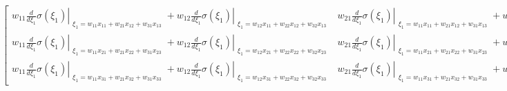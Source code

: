 $\displaystyle \left[\begin{matrix}w_{11} \left. \frac{d}{d \xi_{1}} \sigma{\left(\xi_{1} \right)} \right|_{\substack{ \xi_{1}=w_{11} x_{11} + w_{21} x_{12} + w_{31} x_{13} }} + w_{12} \left. \frac{d}{d \xi_{1}} \sigma{\left(\xi_{1} \right)} \right|_{\substack{ \xi_{1}=w_{12} x_{11} + w_{22} x_{12} + w_{32} x_{13} }} & w_{21} \left. \frac{d}{d \xi_{1}} \sigma{\left(\xi_{1} \right)} \right|_{\substack{ \xi_{1}=w_{11} x_{11} + w_{21} x_{12} + w_{31} x_{13} }} + w_{22} \left. \frac{d}{d \xi_{1}} \sigma{\left(\xi_{1} \right)} \right|_{\substack{ \xi_{1}=w_{12} x_{11} + w_{22} x_{12} + w_{32} x_{13} }} & w_{31} \left. \frac{d}{d \xi_{1}} \sigma{\left(\xi_{1} \right)} \right|_{\substack{ \xi_{1}=w_{11} x_{11} + w_{21} x_{12} + w_{31} x_{13} }} + w_{32} \left. \frac{d}{d \xi_{1}} \sigma{\left(\xi_{1} \right)} \right|_{\substack{ \xi_{1}=w_{12} x_{11} + w_{22} x_{12} + w_{32} x_{13} }}\\w_{11} \left. \frac{d}{d \xi_{1}} \sigma{\left(\xi_{1} \right)} \right|_{\substack{ \xi_{1}=w_{11} x_{21} + w_{21} x_{22} + w_{31} x_{23} }} + w_{12} \left. \frac{d}{d \xi_{1}} \sigma{\left(\xi_{1} \right)} \right|_{\substack{ \xi_{1}=w_{12} x_{21} + w_{22} x_{22} + w_{32} x_{23} }} & w_{21} \left. \frac{d}{d \xi_{1}} \sigma{\left(\xi_{1} \right)} \right|_{\substack{ \xi_{1}=w_{11} x_{21} + w_{21} x_{22} + w_{31} x_{23} }} + w_{22} \left. \frac{d}{d \xi_{1}} \sigma{\left(\xi_{1} \right)} \right|_{\substack{ \xi_{1}=w_{12} x_{21} + w_{22} x_{22} + w_{32} x_{23} }} & w_{31} \left. \frac{d}{d \xi_{1}} \sigma{\left(\xi_{1} \right)} \right|_{\substack{ \xi_{1}=w_{11} x_{21} + w_{21} x_{22} + w_{31} x_{23} }} + w_{32} \left. \frac{d}{d \xi_{1}} \sigma{\left(\xi_{1} \right)} \right|_{\substack{ \xi_{1}=w_{12} x_{21} + w_{22} x_{22} + w_{32} x_{23} }}\\w_{11} \left. \frac{d}{d \xi_{1}} \sigma{\left(\xi_{1} \right)} \right|_{\substack{ \xi_{1}=w_{11} x_{31} + w_{21} x_{32} + w_{31} x_{33} }} + w_{12} \left. \frac{d}{d \xi_{1}} \sigma{\left(\xi_{1} \right)} \right|_{\substack{ \xi_{1}=w_{12} x_{31} + w_{22} x_{32} + w_{32} x_{33} }} & w_{21} \left. \frac{d}{d \xi_{1}} \sigma{\left(\xi_{1} \right)} \right|_{\substack{ \xi_{1}=w_{11} x_{31} + w_{21} x_{32} + w_{31} x_{33} }} + w_{22} \left. \frac{d}{d \xi_{1}} \sigma{\left(\xi_{1} \right)} \right|_{\substack{ \xi_{1}=w_{12} x_{31} + w_{22} x_{32} + w_{32} x_{33} }} & w_{31} \left. \frac{d}{d \xi_{1}} \sigma{\left(\xi_{1} \right)} \right|_{\substack{ \xi_{1}=w_{11} x_{31} + w_{21} x_{32} + w_{31} x_{33} }} + w_{32} \left. \frac{d}{d \xi_{1}} \sigma{\left(\xi_{1} \right)} \right|_{\substack{ \xi_{1}=w_{12} x_{31} + w_{22} x_{32} + w_{32} x_{33} }}\end{matrix}\right]$

